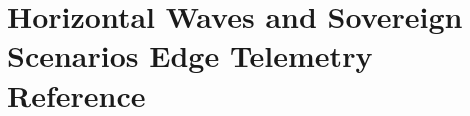 \documentclass[11pt,a4paper]{book}
\newif\ifusebiblatex
\DeclareRobustCommand{\_}{\ifmmode\text{\symbol{95}}\else\symbol{95}\allowbreak\fi}
\theoremstyle{plain}
\theoremstyle{definition}
\begin{document}
\part{Horizontal Waves and Sovereign Scenarios Edge Telemetry Reference}







\backmatter
\ifusebiblatex
    \printbibliography[heading=bibintoc]
\else
    \cleardoublepage
    
    
\fi
\end{document}
